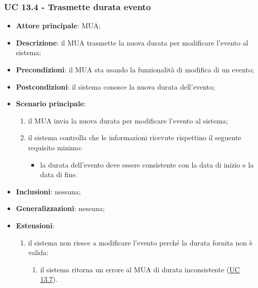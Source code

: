     \subsubsection{UC 13.4 - Trasmette durata evento} \label{sec:UC13.4}
    \begin{itemize}
        \item \textbf{Attore principale}: MUA;
        \item \textbf{Descrizione}: il MUA trasmette la nuova durata per modificare l'evento al sistema;
        \item \textbf{Precondizioni}: il MUA sta usando la funzionalità di modifica di un evento;
        \item \textbf{Postcondizioni}: il sistema conosce la nuova durata dell'evento;
        \item \textbf{Scenario principale}:
            \begin{enumerate}
                \item il MUA invia la nuova durata per modificare l'evento al sistema;
                \item il sistema controlla che le informazioni ricevute rispettino il seguente requisito minimo:
                    \begin{itemize}
                        \item la durata dell'evento deve essere consistente con la data di inizio e la data di fine.
                    \end{itemize}
            \end{enumerate}
        \item \textbf{Inclusioni}: nessuna;
        \item \textbf{Generalizzazioni}: nessuna;
        \item \textbf{Estensioni}:
            \begin{enumerate}[label=\alph*.]
                \item il sistema non riesce a modificare l'evento perché la durata fornita non è valida:
                \begin{enumerate}[label=\arabic*.]
                    \item il sistema ritorna un errore al MUA di durata inconsistente (\hyperref[sec:UC13.7]{UC 13.7}).
                \end{enumerate}
            \end{enumerate}
    \end{itemize}


